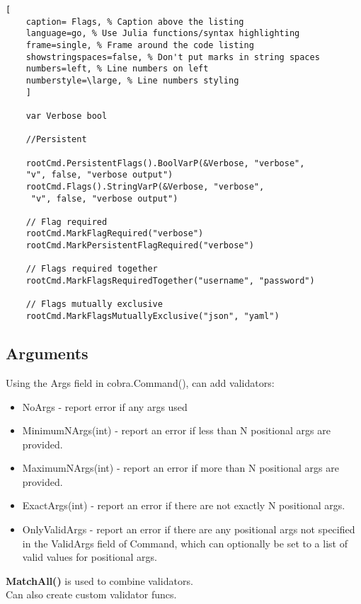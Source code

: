 \documentclass[11pt]{scrartcl} %
\begin{document}
\begin{lstlisting}[
	caption= Flags, % Caption above the listing
	language=go, % Use Julia functions/syntax highlighting
	frame=single, % Frame around the code listing
	showstringspaces=false, % Don't put marks in string spaces
	numbers=left, % Line numbers on left
	numberstyle=\large, % Line numbers styling
	]

	var Verbose bool

	//Persistent

	rootCmd.PersistentFlags().BoolVarP(&Verbose, "verbose", 
	"v", false, "verbose output")
	rootCmd.Flags().StringVarP(&Verbose, "verbose",
	 "v", false, "verbose output")

	// Flag required
	rootCmd.MarkFlagRequired("verbose")
	rootCmd.MarkPersistentFlagRequired("verbose")

	// Flags required together
	rootCmd.MarkFlagsRequiredTogether("username", "password")

	// Flags mutually exclusive
	rootCmd.MarkFlagsMutuallyExclusive("json", "yaml")

\end{lstlisting}

\subsection{Arguments}

Using the Args field in cobra.Command(), can add validators:

\begin{itemize}
	\item NoArgs - report error if any args used
	\item MinimumNArgs(int) - report an error if less than N positional args are provided.
	\item MaximumNArgs(int) - report an error if more than N positional args are provided.
	\item ExactArgs(int) - report an error if there are not exactly N positional args.
	\item OnlyValidArgs - report an error if there are any positional args not specified in the ValidArgs field of 
	Command, which can optionally be set to a list of valid values for positional args.
\end{itemize}

\textbf{MatchAll()} is used to combine validators.\\

Can also create custom validator funcs.
\end{document}
